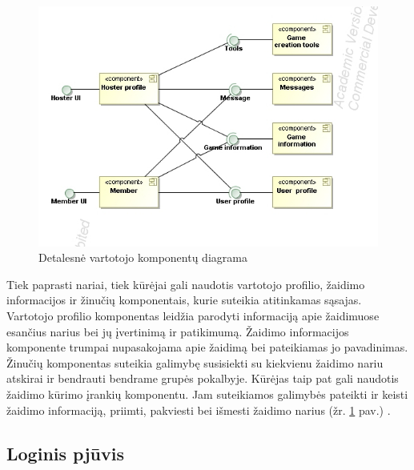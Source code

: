 \documentclass{VUMIFPSkursinis}
\begin{document}
		\begin{figure}[H]
			\centering
			\includegraphics[scale=0.6]{img/UMLComponent3}
			\caption{Detalesnė vartotojo komponentų diagrama}
			\label{img:UMLComponent3}
		\end{figure}
		Tiek paprasti nariai, tiek kūrėjai gali naudotis vartotojo profilio, žaidimo informacijos ir žinučių komponentais, kurie suteikia atitinkamas sąsajas. Vartotojo profilio komponentas leidžia parodyti informaciją apie žaidimuose esančius narius bei jų įvertinimą ir patikimumą. Žaidimo informacijos komponente trumpai nupasakojama apie žaidimą bei pateikiamas jo pavadinimas. Žinučių komponentas suteikia galimybę susisiekti su kiekvienu žaidimo nariu atskirai ir bendrauti bendrame grupės pokalbyje. Kūrėjas taip pat gali naudotis žaidimo kūrimo įrankių komponentu. Jam suteikiamos galimybės pateikti ir keisti žaidimo informaciją, priimti, pakviesti bei išmesti žaidimo narius (žr. \ref{img:UMLComponent3} pav.) .

			
\subsection{Loginis pjūvis}
\end{document}
